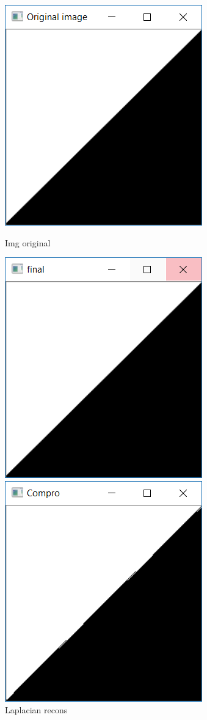 \documentclass{article}
\begin{document}
\begin{figure}[h]
\begin{minipage}[b]{0.3\linewidth}
\centering
\includegraphics[scale=0.4]{img1.PNG}
\caption{Img original}	
\end{minipage}
\begin{minipage}[b]{0.3\linewidth}
\centering
\includegraphics[scale=0.4]{img2.PNG}
\caption{Laplacian recons}
\end{minipage}
\begin{minipage}[b]{0.3\linewidth}
\centering
\includegraphics[scale=0.4]{img3.PNG}

\end{minipage}
\end{figure}
\end{document}

